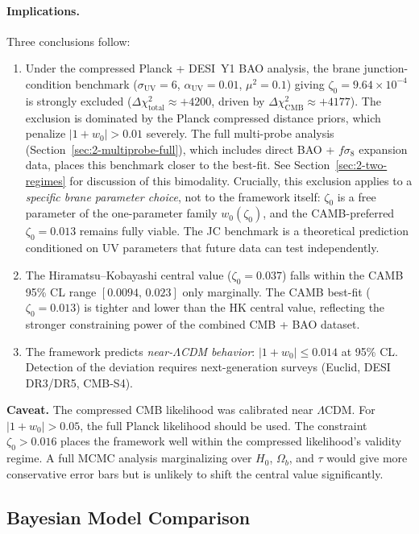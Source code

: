 \paragraph{Implications.} Three conclusions follow:
\begin{enumerate}
  \item Under the compressed Planck + DESI~Y1 BAO analysis, the brane junction-condition benchmark ($\sigma_\mathrm{UV} = 6$, $\alpha_\mathrm{UV} = 0.01$, $\mu^2 = 0.1$) giving $\zeta_0 = 9.64 \times 10^{-4}$ is strongly excluded ($\Delta\chi^2_\mathrm{total} \approx +4200$, driven by $\Delta\chi^2_\mathrm{CMB} \approx +4177$). The exclusion is dominated by the Planck compressed distance priors, which penalize $|1+w_0| > 0.01$ severely. The full multi-probe analysis (Section~\ref{sec:2-multiprobe-full}), which includes direct BAO + $f\sigma_8$ expansion data, places this benchmark closer to the best-fit. See Section~\ref{sec:2-two-regimes} for discussion of this bimodality. Crucially, this exclusion applies to a \emph{specific brane parameter choice}, not to the framework itself: $\zeta_0$ is a free parameter of the one-parameter family $w_0(\zeta_0)$, and the CAMB-preferred $\zeta_0 = 0.013$ remains fully viable. The JC benchmark is a theoretical prediction conditioned on UV parameters that future data can test independently.
  \item The Hiramatsu--Kobayashi central value ($\zeta_0 = 0.037$) falls within the CAMB 95\% CL range $[0.0094,\, 0.023]$ only marginally. The CAMB best-fit ($\zeta_0 = 0.013$) is tighter and lower than the HK central value, reflecting the stronger constraining power of the combined CMB + BAO dataset.
  \item The framework predicts \emph{near-$\Lambda$CDM behavior}: $|1+w_0| \leq 0.014$ at 95\% CL. Detection of the deviation requires next-generation surveys (Euclid, DESI DR3/DR5, CMB-S4).
\end{enumerate}

\textbf{Caveat.} The compressed CMB likelihood was calibrated near $\Lambda$CDM. For $|1+w_0| > 0.05$, the full Planck likelihood should be used. The constraint $\zeta_0 > 0.016$ places the framework well within the compressed likelihood's validity regime. A full MCMC analysis marginalizing over $H_0$, $\Omega_b$, and $\tau$ would give more conservative error bars but is unlikely to shift the central value significantly.

\subsection{Bayesian Model Comparison}
\label{sec:2-Bayes}

